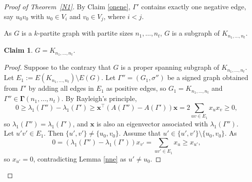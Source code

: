 \documentclass[12pt]{article}
\numberwithin{equation}{section}
\newtheorem {Claim} {Claim}[section]
\begin{document}
\begin{proof}[Proof of Theorem~\ref{N1}]
 By Claim \ref{onene}, $\Gamma'$ contains exactly one negative edge, say  $u_0v_0$ with $u_0\in V_i$ and $v_0\in V_j$, where $i<j$.

As $G$ is a $k$-partite graph with partite sizes $n_1,\dots, n_t$, $G$ is a subgraph of $K_{n_1,\dots, n_t}$. 

\begin{Claim}\label{complete}
$G= K_{n_1, \dots, n_t}$.
\end{Claim}

\begin{proof}
Suppose to the contrary that $G$ is a proper spanning subgraph of $K_{n_1, \dots, n_t}$. 
Let  $E_1:=E(K_{n_1, \dots, n_t})\setminus E(G)$. 
Let $\Gamma''=(G_1,\sigma'')$ be a signed graph obtained from $\Gamma'$ by adding all  edges in $E_1$ as positive edges, so $G_1=K_{n_1, \dots, n_t}$ and  $\Gamma''\in \boldsymbol\Gamma (n_1,\dots, n_t)$. 
By Rayleigh's principle, 
\[
0\ge \lambda_1(\Gamma'')-\lambda_1(\Gamma')\ge \mathbf{x}^\top \left(A(\Gamma'')-A(\Gamma')\right)\mathbf{x}=2\sum_{uv\in E_1}x_ux_v\ge0, 
\]
so $\lambda_1(\Gamma'')=\lambda_1(\Gamma')$, and $\mathbf{x}$ is also an eigenvector associated with $\lambda_1(\Gamma'')$. 
Let $u'v'\in E_1$. 
Then  $\{u', v'\}\ne \{u_0, v_0\}$. Assume that $u'\in \{u', v'\}\setminus \{u_0, v_0\}$. 
As 
\[
0=\left(\lambda_1(\Gamma'')-\lambda_1(\Gamma')\right)x_{v'}=\sum_{uv'\in E_1}x_u\ge x_{u'}, 
\]
so $x_{u'}=0$, contradicting  Lemma \ref{nne} as $u'\ne u_0$. %
\end{proof}






\end{proof}
\end{document}
